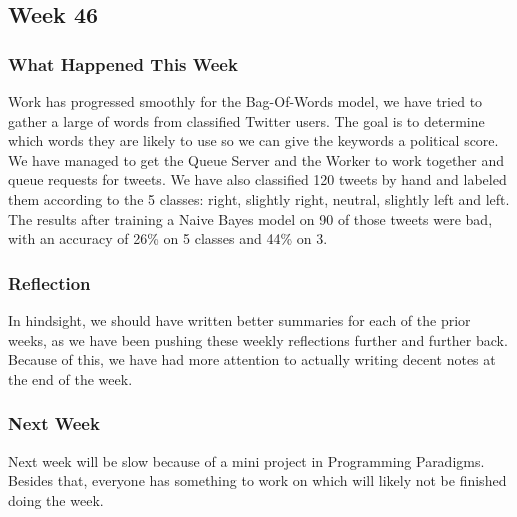 \subsection{Week 46} 
\subsubsection{What Happened This Week} 
Work has progressed smoothly for the Bag-Of-Words model, we have tried to
gather a large of words from classified Twitter users. The goal is to determine
which words they are likely to use so we can give the keywords a political
score. We have managed to get the Queue Server and the Worker to work together
and queue requests for tweets. We have also classified 120 tweets by hand and
labeled them according to the 5 classes: right, slightly right, neutral,
slightly left and left. The results after training a Naive Bayes model on 90 of
those tweets were bad, with an accuracy of 26\% on 5 classes and 44\% on 3.

\subsubsection{Reflection} 
In hindsight, we should have written better summaries for each of the prior
weeks, as we have been pushing these weekly reflections further and further
back. Because of this, we have had more attention to actually writing decent notes
at the end of the week.

\subsubsection{Next Week} 
Next week will be slow because of a mini project in Programming Paradigms.
Besides that, everyone has something to work on which will likely not be
finished doing the week.



